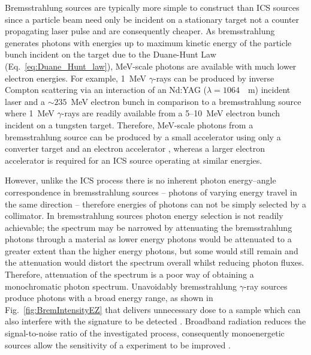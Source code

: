 \documentclass[../main.tex]{subfiles}
\begin{document}
Bremsstrahlung sources are typically more simple to construct than ICS sources since a particle beam need only be incident on a stationary target not a counter propagating laser pulse and are consequently cheaper. As bremsstrahlung generates photons with energies up to maximum kinetic energy of the particle bunch incident on the target due to the Duane-Hunt Law (Eq.~\ref{eq:Duane_Hunt_law}), \si{\mega\electronvolt}-scale photons are available with much lower electron energies. For example, 1~\si{\mega\electronvolt} $\gamma$-rays can be produced by inverse Compton scattering via an interaction of an Nd:YAG ($\lambda = 1064$~\si{\nao\meter}) incident laser and a $\sim 235$~\si{\mega\electronvolt} electron bunch in comparison to a bremsstrahlung source where 1~\si{\mega\electronvolt} $\gamma$-rays are readily available from a 5--10~\si{\mega\electronvolt} electron bunch incident on a tungsten target. Therefore, \si{\mega\electronvolt}-scale photons from a bremsstrahlung source can be produced by a small accelerator using only a converter target and an electron
accelerator \cite{chin2021application}, whereas a larger electron accelerator is required for an ICS source operating at similar energies.

However, unlike the ICS process there is no inherent photon energy--angle correspondence in bremsstrahlung sources -- photons of varying energy travel in the same direction -- therefore energies of photons can not be simply selected by a collimator. In bremsstrahlung sources photon energy selection is not readily achievable; the spectrum may be narrowed by attenuating the bremsstrahlung photons through a material as lower energy photons would be attenuated to a greater extent than the higher energy photons, but some would still remain and the attenuation would distort the spectrum overall whilst reducing photon fluxes. Therefore, attenuation of the spectrum is a poor way of obtaining a monochromatic photon spectrum. Unavoidably bremsstrahlung $\gamma$-ray sources produce photons with a broad energy range, as shown in Fig.~\ref{fig:BremIntensityEZ} that delivers unnecessary dose to a sample which can also interfere with the signature to be detected \cite{geddes2017impact}. Broadband radiation reduces the signal-to-noise ratio of the investigated process, consequently monoenergetic sources allow the sensitivity of a experiment to be improved \cite{jones2008bremsstrahlung}.
\end{document}
